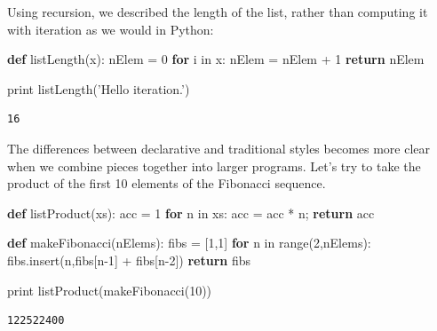 \documentclass[]{article}
\newenvironment{Shaded}{}{}
\newcommand{\KeywordTok}[1]{\textcolor[rgb]{0.00,0.44,0.13}{\textbf{{#1}}}}
\newcommand{\DataTypeTok}[1]{\textcolor[rgb]{0.56,0.13,0.00}{{#1}}}
\newcommand{\DecValTok}[1]{\textcolor[rgb]{0.25,0.63,0.44}{{#1}}}
\newcommand{\StringTok}[1]{\textcolor[rgb]{0.25,0.44,0.63}{{#1}}}
\newcommand{\NormalTok}[1]{{#1}}
\begin{document}
\doublespacing

Using recursion, we described the length of the list, rather than
computing it with iteration as we would in Python:

\singlespacing

\begin{Shaded}
\begin{Highlighting}[]
\KeywordTok{def} \NormalTok{listLength(x):}
    \NormalTok{nElem = }\DecValTok{0}
    \KeywordTok{for} \NormalTok{i in x:}
        \NormalTok{nElem = nElem + }\DecValTok{1}
    \KeywordTok{return} \NormalTok{nElem }

\DataTypeTok{print} \NormalTok{listLength(}\StringTok{'Hello iteration.'}\NormalTok{)}
\end{Highlighting}
\end{Shaded}

\begin{verbatim}
16
\end{verbatim}

\doublespacing

The differences between declarative and traditional styles becomes more
clear when we combine pieces together into larger programs. Let's try to
take the product of the first 10 elements of the Fibonacci sequence.

\singlespacing

\begin{Shaded}
\begin{Highlighting}[]
\KeywordTok{def} \NormalTok{listProduct(xs):}
    \NormalTok{acc = }\DecValTok{1}
    \KeywordTok{for} \NormalTok{n in xs:}
        \NormalTok{acc = acc * n;}
    \KeywordTok{return} \NormalTok{acc}

\KeywordTok{def} \NormalTok{makeFibonacci(nElems):}
    \NormalTok{fibs = [}\DecValTok{1}\NormalTok{,}\DecValTok{1}\NormalTok{]}
    \KeywordTok{for} \NormalTok{n in }\DataTypeTok{range}\NormalTok{(}\DecValTok{2}\NormalTok{,nElems):}
        \NormalTok{fibs.insert(n,fibs[n}\DecValTok{-1}\NormalTok{] + fibs[n}\DecValTok{-2}\NormalTok{])}
    \KeywordTok{return} \NormalTok{fibs}

\DataTypeTok{print} \NormalTok{listProduct(makeFibonacci(}\DecValTok{10}\NormalTok{))}

\end{Highlighting}
\end{Shaded}

\begin{verbatim}
122522400
\end{verbatim}
\end{document}
